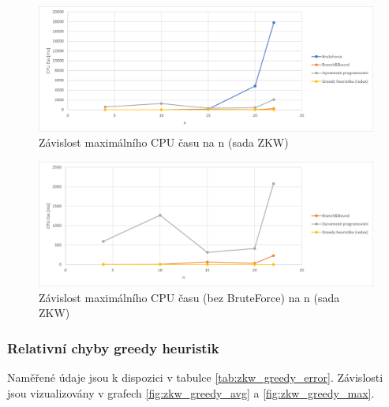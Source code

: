 \documentclass[12pt]{article}
\begin{document}
\begin{figure}[ht]\centering
    \includegraphics[width=1\textwidth, keepaspectratio]{graphs/ZKW/times/zkw_cpu_time_max.png}
    \caption{Závislost maximálního CPU času na n (sada ZKW)}
    \label{fig:zkw_cpu_time_max}
\end{figure}

\begin{figure}[ht]\centering
    \includegraphics[width=1\textwidth, keepaspectratio]{graphs/ZKW/times/zkw_cpu_time_max_without_brute_force.png}
    \caption{Závislost maximálního CPU času (bez BruteForce) na n (sada ZKW)}
    \label{fig:zkw_cpu_time_max_without_brute_force}
\end{figure}

\subsubsection{Relativní chyby greedy heuristik}

Naměřené údaje jsou k dispozici v tabulce \ref{tab:zkw_greedy_error}. Závislosti jsou vizualizovány v grafech \ref{fig:zkw_greedy_avg} a \ref{fig:zkw_greedy_max}.
\end{document}
